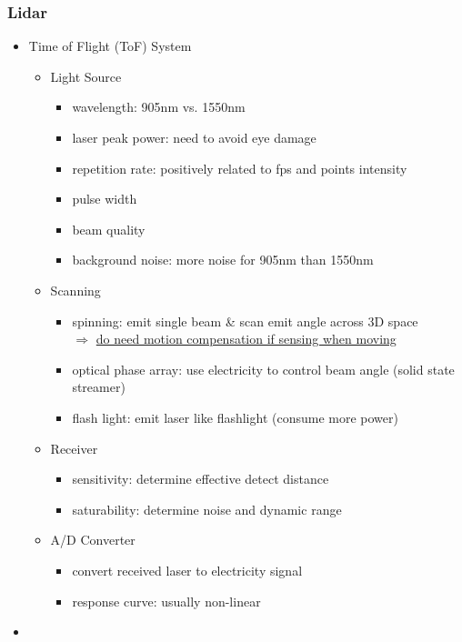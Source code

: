 \subsubsection{Lidar}
\begin{itemize}
\item Time of Flight (ToF) System
	\begin{itemize}
	\item Light Source
		\begin{itemize}
		\item wavelength: 905nm vs. 1550nm
		\item laser peak power: need to avoid eye damage
		\item repetition rate: positively related to fps and points intensity
		\item pulse width
		\item beam quality
		\item background noise: more noise for 905nm than 1550nm
		\end{itemize}
	\item Scanning
		\begin{itemize}
		\item spinning: emit single beam \& scan emit angle across 3D space \\
		$\Rightarrow$ \underline{do need motion compensation if sensing when moving}
		\item optical phase array: use electricity to control beam angle (solid state streamer)
		\item flash light: emit laser like flashlight (consume more power)
		\end{itemize}
	\item Receiver
		\begin{itemize}
		\item sensitivity: determine effective detect distance
		\item saturability: determine noise and dynamic range
		\end{itemize}
	\item A/D Converter
		\begin{itemize}
		\item convert received laser to electricity signal
		\item response curve: usually non-linear
		\end{itemize}
	\end{itemize}
\item 
\end{itemize}

